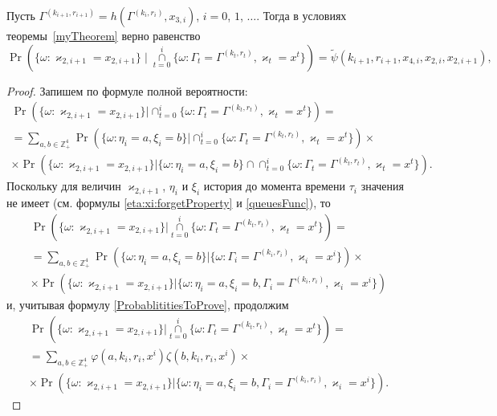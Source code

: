 \documentclass[a4paper,12pt,russian]{extarticle}
\begin{document}
\begin{corollary}
Пусть $\Gamma^{(k_{i+1},r_{i+1})}=h(\Gamma^{(k_i,r_i)},x_{3,i})$, $i=0$, $1$, $\ldots$. Тогда в условиях теоремы~\ref{myTheorem} верно равенство
\begin{equation}
\Pr (\{ \omega \colon \varkappa_{2,i+1} = x_{2,i+1}\} \mid\mathop{\cap}\limits_{t=0}^{i}\{\omega\colon \Gamma_t=\Gamma^{(k_t,r_t)}, \varkappa_t=x^t\})=\widetilde{\psi}(k_{i+1},r_{i+1},x_{4,i},x_{2,i},x_{2,i+1}),
\label{kappa:2:conditional}
\end{equation}
\end{corollary}
\begin{proof}
Запишем по формуле полной вероятности:
\begin{multline*}
\Pr (\{ \omega \colon \varkappa_{2,i+1} = x_{2,i+1}\} |\cap_{t=0}^{i}\{\omega\colon \Gamma_t=\Gamma^{(k_t,r_t)}, \varkappa_t=x^t\}) = \\
= \sum_{a,b\in \mathbb{Z}_+^4} \Pr (\{ \omega \colon \eta_i=a, \xi_i=b\} |\cap_{t=0}^{i}\{\omega\colon \Gamma_t=\Gamma^{(k_t,r_t)}, \varkappa_t=x^t\}) \times \\
\times \Pr (\{ \omega \colon \varkappa_{2,i+1} = x_{2,i+1}\} |\{\omega\colon \eta_i=a, \xi_i=b\}\cap \cap_{t=0}^{i}\{\omega\colon \Gamma_t=\Gamma^{(k_t,r_t)}, \varkappa_t=x^t\}).
\end{multline*}
Поскольку для величин $\varkappa_{2,i+1}$, $\eta_i$ и $\xi_i$ история до момента времени $\tau_i$ значения не имеет (см. формулы \eqref{eta:xi:forgetProperty} и \eqref{queuesFunc}), то
\begin{multline*}
\Pr (\{ \omega \colon \varkappa_{2,i+1} = x_{2,i+1}\} |\mathop{\cap}\limits_{t=0}^{i}\{\omega\colon \Gamma_t=\Gamma^{(k_t,r_t)}, \varkappa_t=x^t\}) = \\
=\sum_{a,b\in \mathbb{Z}_+^4} \Pr (\{ \omega \colon \eta_i=a, \xi_i=b\} |\{\omega\colon \Gamma_i=\Gamma^{(k_i,r_i)}, \varkappa_i=x^i\}) \times \\
\times \Pr (\{ \omega \colon \varkappa_{2,i+1} = x_{2,i+1}\} |\{\omega\colon \eta_i=a, \xi_i=b, \Gamma_i=\Gamma^{(k_i,r_i)}, \varkappa_i=x^i\}) 
\end{multline*}
и, учитывая формулу \eqref{ProbablititiesToProve}, продолжим
\begin{multline*}
\Pr (\{ \omega \colon \varkappa_{2,i+1} = x_{2,i+1}\} |\mathop{\cap}\limits_{t=0}^{i}\{\omega\colon \Gamma_t=\Gamma^{(k_t,r_t)}, \varkappa_t=x^t\}) =\\
=\sum_{a,b\in \mathbb{Z}_+^4} \varphi(a,k_i,r_i,x^i)\zeta(b,k_i,r_i,x^i) \times\\
\times \Pr (\{ \omega \colon \varkappa_{2,i+1} = x_{2,i+1}\} |\{\omega\colon \eta_i=a, \xi_i=b, \Gamma_i=\Gamma^{(k_i,r_i)}, \varkappa_i=x^i\}).
\end{multline*}


\end{proof}
\end{document}
